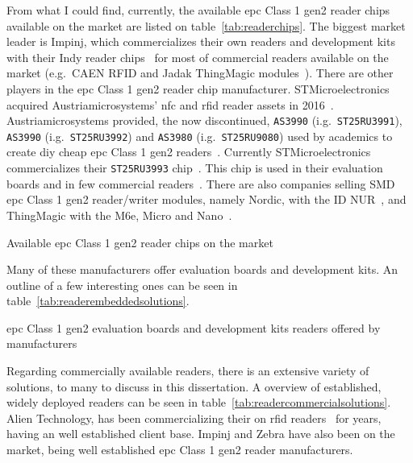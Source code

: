 From what I could find, currently, the available \ac{epc} Class 1 \ac{gen2} reader chips available on the market are listed on table~\ref{tab:readerchips}.
The biggest market leader is Impinj, which commercializes their own readers and development kits with their Indy reader chips~\cite{RAINRFIDReader} for most of commercial readers available on the market (e.g.\ CAEN RFID and Jadak ThingMagic modules~\cite{RAINRFIDPartner}).
There are other players in the \ac{epc} Class 1 \ac{gen2} reader chip manufacturer. 
STMicroelectronics acquired Austriamicrosystems' \ac{nfc} and \ac{rfid} reader assets in 2016~\cite{PressRelease}. Austriamicrosystems provided, the now discontinued, \texttt{AS3990} (i.g.\ \texttt{ST25RU3991}), \texttt{AS3990} (i.g.\ \texttt{ST25RU3992}) and \texttt{AS3980} (i.g.\ \texttt{ST25RU9080}) used by academics to create \acs{diy} cheap \ac{epc} Class 1 \ac{gen2} readers~\cite{tangDesignUHFRFID2010a, leiDesignHandheldUHF2011, liDesignRadioFrequency2011}. Currently STMicroelectronics
commercializes their \texttt{ST25RU3993} chip~\cite{ST25RU3993}. This chip is used in their evaluation boards and in few commercial readers~\cite{UHFMidRange}.
There are also companies selling SMD \ac{epc} Class 1 \ac{gen2} reader/writer modules, namely Nordic, with the ID NUR~\cite{NURModulesNordic}, and ThingMagic with the M6e, Micro and Nano~\cite{ThingMagicRFID}.

\begin{table}
    \centering
    \caption{Available \ac{epc} Class 1 \ac{gen2} reader chips on the market}
    \label{tab:readerchips}
\end{table}

Many of these manufacturers offer evaluation boards and development kits. An outline of a few interesting ones can be seen in table~\ref{tab:readerembeddedsolutions}.

\begin{table}
    \centering
    \caption{\ac{epc} Class 1 \ac{gen2} evaluation boards and development kits readers offered by manufacturers}
    \label{tab:readerembeddedsolutions}
\end{table}

Regarding commercially available readers, there is an extensive variety of solutions, to many to discuss in this dissertation. A overview of established, widely deployed readers can be seen in table~\ref{tab:readercommercialsolutions}.
Alien Technology, has been commercializing their on \ac{rfid} readers~\cite{AlienTechnologyReaders} for years, having an well established client base. Impinj and Zebra have also been on the market, being well established \ac{epc} Class 1 \ac{gen2} reader manufacturers.

